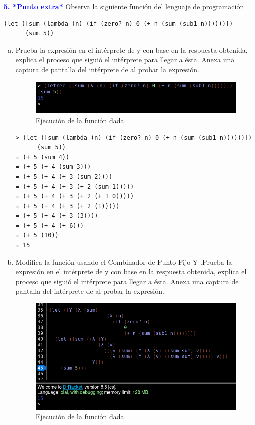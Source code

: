 \Large\textbf{\textcolor{blue}{5.  *Punto extra*}} 
Observa la siguiente función del lenguaje de programación 

\begin{lstlisting}
(let ([sum (lambda (n) (if (zero? n) 0 (+ n (sum (sub1 n))))))])
      (sum 5))
\end{lstlisting}

\begin{enumerate}[a.]
\item Prueba la expresión en el intérprete de  y con base en la respuesta 
obtenida, explica el proceso que siguió el intérprete para llegar a ésta. Anexa una 
captura de pantalla del intérprete de  al probar la expresión.

\begin{figure}[h]
  \centering
  \includegraphics[scale=0.5]{./Sum.png}
  \caption{Ejecución de la función dada.}
\end{figure}

\begin{lstlisting}
> (let ([sum (lambda (n) (if (zero? n) 0 (+ n (sum (sub1 n))))))])
      (sum 5))
= (+ 5 (sum 4))
= (+ 5 (+ 4 (sum 3)))
= (+ 5 (+ 4 (+ 3 (sum 2))))
= (+ 5 (+ 4 (+ 3 (+ 2 (sum 1)))))
= (+ 5 (+ 4 (+ 3 (+ 2 (+ 1 0)))))
= (+ 5 (+ 4 (+ 3 (+ 2 (1)))))
= (+ 5 (+ 4 (+ 3 (3))))
= (+ 5 (+ 4 (+ 6)))
= (+ 5 (10))
= 15
\end{lstlisting}
\item Modifica la función usando el Combinador de Punto Fijo Y .Prueba la expresión en 
el intérprete de  y con base en la respuesta obtenida, explica el proceso que 
siguió el intérprete para llegar a ésta. Anexa una captura de pantalla del intérprete 
de  al probar la expresión.

\begin{figure}[h]
  \centering
  \includegraphics[scale=0.3]{./Sum-Y.png}
  \caption{Ejecución de la función dada.}
\end{figure}


\end{enumerate}
